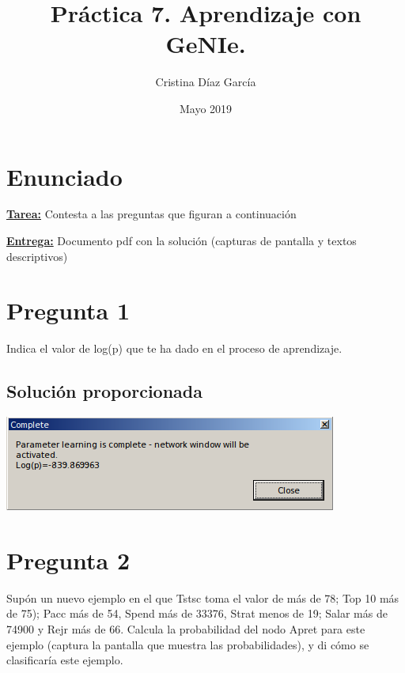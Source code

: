 \documentclass{article}
\title{Práctica 7. Aprendizaje con GeNIe.}
\author{Cristina Díaz García}
\date{Mayo 2019}
\begin{document}

\begin{titlingpage}
\maketitle
\end{titlingpage}

\newpage

\tableofcontents

\newpage

\section{Enunciado}

\textbf{\underline{Tarea:}} Contesta a las preguntas que figuran a continuación

\textbf{\underline{Entrega:}} Documento pdf con la solución (capturas de pantalla y textos descriptivos)

\section{Pregunta 1}

Indica el valor de log(p) que te ha dado en el proceso de aprendizaje.

\subsection{Solución proporcionada}

\begin{center}
\includegraphics[scale=0.5]{images/log.png}
\end{center}

\section{Pregunta 2}

Supón un nuevo ejemplo en el que Tstsc toma el valor de más de 78; Top 10 más de 75); Pacc más de 54, Spend más de 33376, Strat menos de 19; Salar más de 74900 y Rejr más de 66. Calcula la probabilidad del nodo Apret para este ejemplo (captura la pantalla que muestra las probabilidades), y di cómo se clasificaría este ejemplo.
\end{document}
